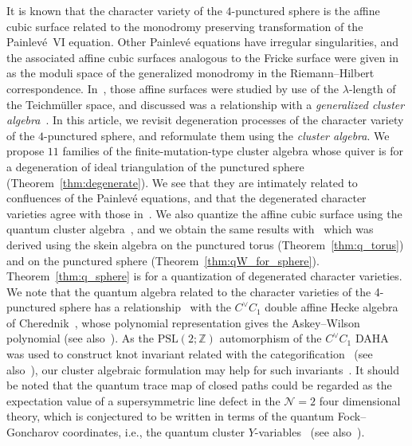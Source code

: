 \documentclass[pdftex]{sigma}
\numberwithin{equation}{section}
\begin{document}
It is known that the character variety of the $4$-punctured sphere is the affine cubic surface related to the monodromy preserving transformation of the Painlev{\'e}~VI equation. Other Painlev{\'e} equations have irregular singularities, and the associated affine cubic surfaces analogous to the Fricke surface were given in~\cite{vdPutSaito09a} as the moduli space of the generalized monodromy in the Riemann--Hilbert correspondence.
In~\cite{ChekMazzRubt15a}, those affine surfaces were studied by use of the $\lambda$-length of the Teichm{\"u}ller space, and discussed was a relationship with a \emph{generalized cluster algebra}~\cite{ChekhShapi14a}.
In this article, we revisit degeneration processes of the character variety of the $4$-punctured sphere, and reformulate them using the \emph{cluster algebra}. We propose $11$ families of the finite-mutation-type cluster algebra whose quiver is for a degeneration of ideal triangulation of the punctured sphere (Theorem~\ref{thm:degenerate}). We see that they are intimately related to confluences of the Painlev{\'e} equations, and that the degenerated character varieties agree with those in~\cite{vdPutSaito09a}. We also quantize the affine cubic surface using the quantum cluster algebra~\cite{BerenZelev05a,FockGonc09a}, and we obtain the same results with~\cite{BulloPrzyt99a} which was derived using the skein algebra on the punctured torus (Theorem~\ref{thm:q_torus}) and on the punctured sphere (Theorem~\ref{thm:qW_for_sphere}). Theorem~\ref{thm:q_sphere} is for a quantization of degenerated character varieties. We note that the quantum algebra related to the character varieties of the 4-punctured sphere has a relationship~\cite{Oblom04a} with the $C^\vee C_1$ double affine Hecke algebra of Cherednik~\cite{Chered05Book}, whose polynomial representation gives the Askey--Wilson polynomial (see also~\cite{Koorn08a,Terwil13a}). As the $\mathrm{PSL}(2;\mathbb{Z})$ automorphism of the $C^\vee C_1$ DAHA was used to construct knot invariant related with the categorification~\cite{IChered16a} (see also~\cite{BerestSamuel16a}), our cluster algebraic formulation may help for such invariants~\cite{Hikami}. It should be noted that
the quantum trace map of closed paths could be regarded as the expectation value of a supersymmetric line defect in the $\mathcal{N}=2$ four dimensional theory, which is conjectured to be written in terms of the quantum
Fock--Goncharov coordinates, i.e., the quantum cluster $Y$-variables~\cite{GaioMoorNeit13a} (see also~\cite{MGabel17a}).
\end{document}
